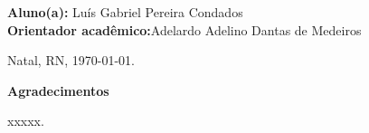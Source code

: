 \documentclass[a4paper, 12pt]{article}
\begin{document}
\normalsize
\vfill

\begin{flushleft}
{\bf Aluno(a):} Luís Gabriel Pereira Condados \\
{\bf Orientador acadêmico:}Adelardo Adelino Dantas de Medeiros\\
\end{flushleft}

\vfill

\begin{center}
Natal, RN, \today.
\end{center}

\newpage


\begin{center}
{\bf \Large Agradecimentos}
\end{center}

xxxxx.

\newpage

\tableofcontents

\newpage

\listoffigures
{}

\newpage
\listoftables
{}








\end{document}
